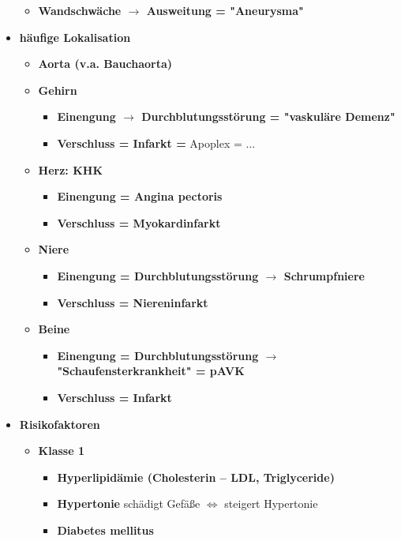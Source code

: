 \begin{itemize}
\begin{itemize}
						\item \textbf{Wandschwäche $\rightarrow$ Ausweitung = "Aneurysma"}
					\end{itemize}
			\item \textbf{häufige Lokalisation}
				\begin{itemize}
					\item \textbf{Aorta (v.a. Bauchaorta)}
					\item \textbf{Gehirn}
						\begin{itemize}
							\item \textbf{Einengung $\rightarrow$ Durchblutungsstörung = "vaskuläre Demenz"}
							\item \textbf{Verschluss = Infarkt =} Apoplex = \textbf{$\dots$}
						\end{itemize}
					\item \textbf{Herz: KHK}
						\begin{itemize}
							\item \textbf{Einengung = Angina pectoris}
							\item \textbf{Verschluss = Myokardinfarkt}
						\end{itemize}
					\item \textbf{Niere}
						\begin{itemize}
							\item \textbf{Einengung = Durchblutungsstörung $\rightarrow$ Schrumpfniere}
							\item \textbf{Verschluss = Niereninfarkt}
						\end{itemize}
					\item \textbf{Beine}
						\begin{itemize}
							\item \textbf{Einengung = Durchblutungsstörung $\rightarrow$ "Schaufensterkrankheit" = pAVK}
							\item \textbf{Verschluss = Infarkt}
						\end{itemize}
				\end{itemize}
			\item \textbf{Risikofaktoren}
				\begin{itemize}
					\item \textbf{Klasse 1}	
						\begin{itemize}
							\item \textbf{Hyperlipidämie (Cholesterin – LDL, Triglyceride)}
							\item \textbf{Hypertonie} schädigt Gefäße $\Leftrightarrow$ steigert Hypertonie
							\item \textbf{Diabetes mellitus}

\end{itemize}
\end{itemize}
\end{itemize}
